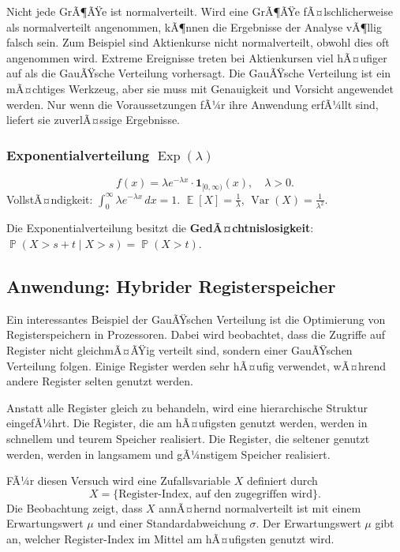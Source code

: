 ﻿\documentclass[12pt,a4paper]{article}
\theoremstyle{definition}
\theoremstyle{plain}
\theoremstyle{remark}
\DeclareMathOperator{\E}{\mathbb{E}}
\DeclareMathOperator{\Var}{Var}
\DeclareMathOperator{\Prob}{\mathbb{P}}
\begin{document}
Nicht jede GrÃ¶ÃŸe ist normalverteilt. Wird eine GrÃ¶ÃŸe fÃ¤lschlicherweise als
normalverteilt angenommen, kÃ¶nnen die Ergebnisse der Analyse vÃ¶llig falsch
sein. Zum Beispiel sind Aktienkurse nicht normalverteilt, obwohl dies oft
angenommen wird. Extreme Ereignisse treten bei Aktienkursen viel hÃ¤ufiger auf
als die GauÃŸsche Verteilung vorhersagt. Die GauÃŸsche Verteilung ist ein
mÃ¤chtiges Werkzeug, aber sie muss mit Genauigkeit und Vorsicht angewendet
werden. Nur wenn die Voraussetzungen fÃ¼r ihre Anwendung erfÃ¼llt sind, liefert
sie zuverlÃ¤ssige Ergebnisse.

\subsubsection{Exponentialverteilung $\operatorname{Exp}(\lambda)$}

\[
  f(x) = \lambda e^{-\lambda x} \cdot \mathbf{1}_{[0,\infty)}(x), \quad \lambda>0.
\]
VollstÃ¤ndigkeit: $\int_0^{\infty}\lambda e^{-\lambda x}\,dx = 1$.
$\E[X] = \frac{1}{\lambda}$, $\Var(X) = \frac{1}{\lambda^2}$.

Die Exponentialverteilung besitzt die \textbf{GedÃ¤chtnislosigkeit}:
$\Prob(X > s+t \mid X > s) = \Prob(X > t)$.

\subsection{Anwendung: Hybrider Registerspeicher}
\label{subsec:registerspeicher}

Ein interessantes Beispiel der GauÃŸschen Verteilung ist die Optimierung von
Registerspeichern in Prozessoren. Dabei wird beobachtet, dass die Zugriffe
auf Register nicht gleichmÃ¤ÃŸig verteilt sind, sondern einer GauÃŸschen
Verteilung folgen. Einige Register werden sehr hÃ¤ufig verwendet, wÃ¤hrend
andere Register selten genutzt werden.

Anstatt alle Register gleich zu behandeln, wird eine hierarchische Struktur
eingefÃ¼hrt. Die Register, die am hÃ¤ufigsten genutzt werden, werden in
schnellem und teurem Speicher realisiert. Die Register, die seltener genutzt
werden, werden in langsamem und gÃ¼nstigem Speicher realisiert.

FÃ¼r diesen Versuch wird eine Zufallsvariable $X$ definiert durch
\[
  X = \{\text{Register-Index, auf den zugegriffen wird}\}.
\]
Die Beobachtung zeigt, dass $X$ annÃ¤hernd normalverteilt ist mit einem
Erwartungswert $\mu$ und einer Standardabweichung $\sigma$. Der Erwartungswert
$\mu$ gibt an, welcher Register-Index im Mittel am hÃ¤ufigsten genutzt wird.
\end{document}
